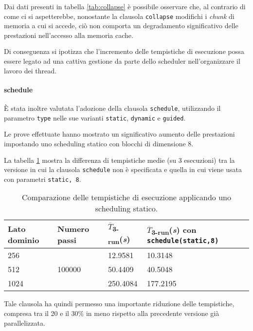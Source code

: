 
Dai dati presenti in tabella \ref{tab:collapse} è possibile osservare che, al
contrario di come ci si aspetterebbe, nonostante la clausola \texttt{collapse}
modifichi i \textit{chunk} di memoria a cui si accede, ciò non comporta un
degradamento significativo delle prestazioni nell'accesso alla memoria cache.

Di conseguenza si ipotizza che l'incremento delle tempistiche di esecuzione
possa essere legato ad una cattiva gestione da parte dello scheduler
nell'organizzare il lavoro dei thread.

\paragraph{schedule}

È stata inoltre valutata l'adozione della clausola \texttt{schedule},
utilizzando il parametro \texttt{type} nelle sue varianti \texttt{static},
\texttt{dynamic} e \texttt{guided}.

Le prove effettuate hanno mostrato un significativo aumento delle prestazioni
impostando uno scheduling statico con blocchi di dimensione 8.

La tabella \ref{tab:schedule} mostra la differenza di tempistiche medie (su 3
esecuzioni) tra la versione in cui la clausola \texttt{schedule} non è
specificata e quella in cui viene usata con parametri \texttt{static, 8}.

\begin{table}[ht]
\centering
\begin{tabularx}{400pt}{XXXX}
\toprule
Lato dominio & Numero passi & $\overline{T}$\textsubscript{3-run}(\textit{s})&
$\overline{T}$\textsubscript{3-run}(\textit{s}) con \texttt{schedule(static,8)}\\
\midrule
 256 & \multirow{3}{*}{100000} & 12.9581 & 10.3148 \\
 512 && 50.4409 & 40.5048 \\
 1024 && 250.4084 & 177.2195 \\
\bottomrule
\end{tabularx}
\caption{\label{tab:schedule}Comparazione delle tempistiche di esecuzione
applicando uno scheduling statico.}
\end{table}

Tale clausola ha quindi permesso una importante riduzione delle tempistiche,
compresa tra il 20 e il 30\% in meno rispetto alla precedente versione già
parallelizzata.

